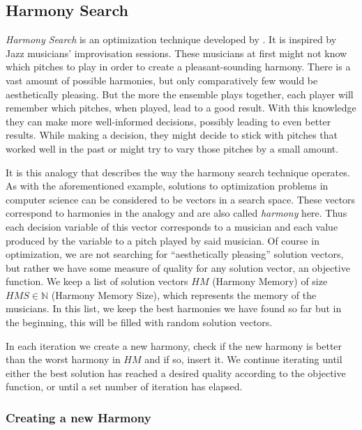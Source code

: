 \subsection{Harmony Search}
\label{subsec:04:hs}

\emph{Harmony Search} is an optimization technique developed by . \cite{geem_optimal_2000}
It is inspired by Jazz musicians' improvisation sessions. \cite{geem_introduction_2022}
These musicians at first might not know which pitches to play in order to create a pleasant-sounding harmony.
There is a vast amount of possible harmonies, but only comparatively few would be aesthetically pleasing.
But the more the ensemble plays together, each player will remember which pitches, when played, lead to a good result.
With this knowledge they can make more well-informed decisions, possibly leading to even better results.
While making a decision, they might decide to stick with pitches that worked well in the past or might try to vary those pitches by a small amount.

It is this analogy that describes the way the harmony search technique operates.
As with the aforementioned example, solutions to optimization problems in computer science can be considered to be vectors in a search space.
These vectors correspond to harmonies in the analogy and are also called \emph{harmony} here.
Thus each decision variable of this vector corresponds to a musician and each value produced by the variable to a pitch played by said musician.
Of course in optimization, we are not searching for \enquote{aesthetically pleasing} solution vectors, but rather we have some measure of quality for any solution vector, an objective function.
We keep a list of solution vectors $HM$ (Harmony Memory) of size $HMS \in \mathbb{N}$ (Harmony Memory Size), which represents the memory of the musicians.
In this list, we keep the best harmonies we have found so far but in the beginning, this will be filled with random solution vectors.

In each iteration we create a new harmony, check if the new harmony is better than the worst harmony in $HM$ and if so, insert it.
We continue iterating until either the best solution has reached a desired quality according to the objective function, or until a set number of iteration has elapsed.

\subsubsection{Creating a new Harmony}

